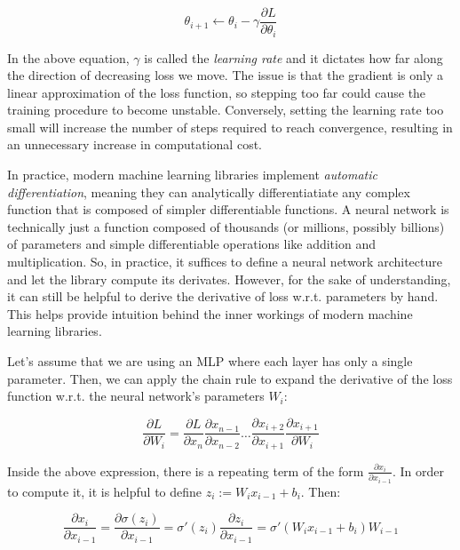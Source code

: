 \documentclass[12pt]{article}
\begin{document}
\begin{equation}
\theta_{i+1} \leftarrow \theta_{i} - \gamma \frac{\partial L}{\partial \theta_i}
\label{eq_sgd}
\end{equation}

In the above equation, $\gamma$ is called the \textit{learning rate} and it dictates how far along the direction of decreasing loss we move. The issue is that the gradient is only a linear approximation of the loss function, so stepping too far could cause the training procedure to become unstable. Conversely, setting the learning rate too small will increase the number of steps required to reach convergence, resulting in an unnecessary increase in computational cost.

In practice, modern machine learning libraries implement \textit{automatic differentiation}, meaning they can analytically differentiatiate any complex function that is composed of simpler differentiable functions. A neural network is technically just a function composed of thousands (or millions, possibly billions) of parameters and simple differentiable operations like addition and multiplication. So, in practice, it suffices to define a neural network architecture and let the library compute its derivates. However, for the sake of understanding, it can still be helpful to derive the derivative of loss w.r.t. parameters by hand. This helps provide intuition behind the inner workings of modern machine learning libraries.

Let's assume that we are using an MLP where each layer has only a single parameter. Then, we can apply the chain rule to expand the derivative of the loss function w.r.t. the neural network's parameters $W_i$:

\begin{equation}
\frac{\partial L}{\partial W_i} = \frac{\partial L}{\partial x_n} \frac{\partial x_{n-1}}{\partial x_{n-2}} \ldots \frac{\partial x_{i+2}}{\partial x_{i+1}} \frac{\partial x_{i+1}}{\partial W_i}
\end{equation}

Inside the above expression, there is a repeating term of the form $\frac{\partial x_{i}}{\partial x_{i-1}}$. In order to compute it, it is helpful to define $z_i := W_i x_{i-1} + b_i$. Then:

\begin{equation}
\frac{\partial x_{i}}{\partial x_{i-1}} = \frac{\partial \sigma(z_{i})}{\partial x_{i-1}} = \sigma'(z_i) \frac{\partial z_{i}}{\partial x_{i-1}} = \sigma'(W_i x_{i-1} + b_i) W_{i-1}
\end{equation}
\end{document}
